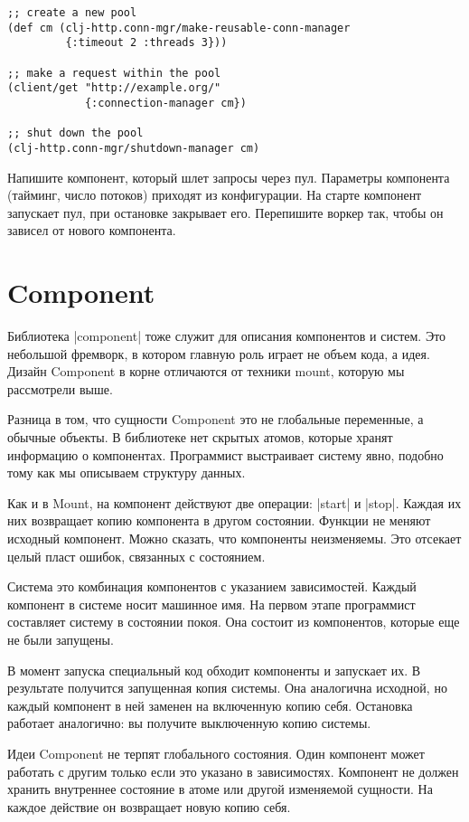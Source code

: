\begin{verbatim}
;; create a new pool
(def cm (clj-http.conn-mgr/make-reusable-conn-manager
         {:timeout 2 :threads 3}))

;; make a request within the pool
(client/get "http://example.org/"
            {:connection-manager cm})

;; shut down the pool
(clj-http.conn-mgr/shutdown-manager cm)
\end{verbatim}

Напишите компонент, который шлет запросы через пул. Параметры компонента
(тайминг, число потоков) приходят из конфигурации. На старте компонент запускает
пул, при остановке закрывает его. Перепишите воркер так, чтобы он зависел от
нового компонента.

\section{Component}

Библиотека \spverb|component|
тоже служит для описания компонентов и систем. Это небольшой фремворк, в котором
главную роль играет не объем кода, а идея. Дизайн Component в корне отличаются
от техники mount, которую мы рассмотрели выше.

Разница в том, что сущности Component это не глобальные переменные, а обычные
объекты. В библиотеке нет скрытых атомов, которые хранят информацию о
компонентах. Программист выстраивает систему явно, подобно тому как мы описываем
структуру данных.

Как и в Mount, на компонент действуют две операции: \spverb|start| и \spverb|stop|. Каждая их
них возвращает копию компонента в другом состоянии. Функции не меняют исходный
компонент. Можно сказать, что компоненты неизменяемы. Это отсекает целый пласт
ошибок, связанных с состоянием.

Система это комбинация компонентов с указанием зависимостей. Каждый компонент в
системе носит машинное имя. На первом этапе программист составляет систему в
состоянии покоя. Она состоит из компонентов, которые еще не были запущены.

В момент запуска специальный код обходит компоненты и запускает их. В результате
получится запущенная копия системы. Она аналогична исходной, но каждый компонент
в ней заменен на включенную копию себя. Остановка работает аналогично: вы
получите выключенную копию системы.

Идеи Component не терпят глобального состояния. Один компонент может работать с
другим только если это указано в зависимостях. Компонент не должен хранить
внутреннее состояние в атоме или другой изменяемой сущности. На каждое действие
он возвращает новую копию себя.

